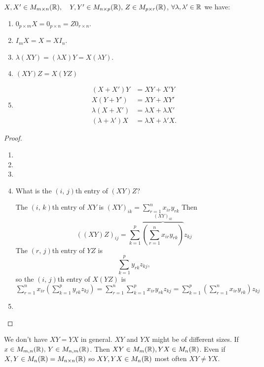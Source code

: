 \documentclass[10pt, a4paper]{article}
\begin{document}
$X, X' \in M_{m \times n}(\mathbb{R}),\quad Y, Y' \in M_{n \times p}(\mathbb{R}),\, Z \in M_{p \times r}(\mathbb{R})$, $\forall \lambda, \lambda' \in \mathbb{R}$ we have:
\begin{enumerate}[label = (\roman*)]
    \item $0_{p \times m}X = 0_{p \times n} = Z0_{r \times n}$.
    \item $I_{m}X = X = XI_{n}$.
    \item $\lambda(XY) = (\lambda X)Y = X(\lambda Y)$.
    \item $(XY)Z = X(YZ)$
    
    \item 
    \begin{align*}
        (X + X')Y &= XY + X'Y \\
        X(Y + Y') &= XY + XY' \\
        \lambda(X + X') &= \lambda X + \lambda X' \\
        (\lambda + \lambda')X &= \lambda X + \lambda' X.
    \end{align*}
\end{enumerate}
\begin{proof}
    \begin{enumerate}[label = (\roman*)]
        \item \phantom{}
        \item \phantom{}
        \item \phantom{}
        \item What is the $(i,\,j)$th entry of $(XY)Z$?

        The $(i,\,k)$th entry of $XY$ is $(XY)_{ik} = \sum_{r = 1}^{n}x_{ir}y_{rk}$
        Then
        \[
        ((XY)Z)_{ij} = \sum_{k = 1}^{p}\overbrace{\left(\sum_{r = 1}^{n}x_{ir}y_{rk}\right)}^{(XY)_{ik}}z_{kj}
        \]
        The $(r,\,j)$th entry of $YZ$ is
        \[
        \sum_{k = 1}^{p}y_{rk}z_{kj},
        \]
        so the $(i,\,j)$th entry of $X(YZ)$ is $\displaystyle\sum_{r = 1}^{n}x_{ir}\left(\sum_{k = 1}^{p}y_{rk}z_{kj}\right) = \sum_{r = 1}^{n}\sum_{k = 1}^{p}x_{ir}y_{rk}z_{kj} = \sum_{k = 1}^{p}\left(\sum_{r = 1}^{n}x_{ir}y_{rk}\right)z_{kj}$
        \item \phantom{}
    \end{enumerate}
\end{proof}

We don't have $XY = YX$ in general. $XY$ and $YX$ might be of different sizes. If $x \in M_{m, n}(\mathbb{R}),\, Y \in M_{n, m}(\mathbb{R})$. Then $XY \in M_{m}(\mathbb{R}), YX \in M_n(\mathbb{R})$. Even if $X, Y \in M_{n}(\mathbb{R}) = M_{n \times n}(\mathbb{R})$ so $XY, YX \in M_{n}(\mathbb{R})$ most often $XY \neq YX$.
\end{document}
